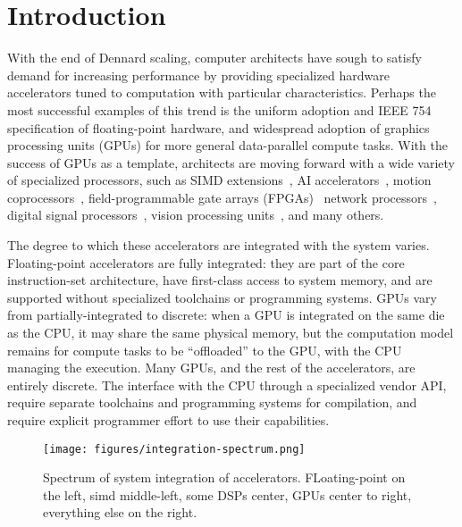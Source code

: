 
\chapter{Introduction}


With the end of Dennard scaling, computer architects have sough to satisfy demand for increasing performance by providing specialized hardware accelerators tuned to computation with particular characteristics.
Perhaps the most successful examples of this trend is the uniform adoption and IEEE 754 specification of floating-point hardware, and widespread adoption of graphics processing units (GPUs) for more general data-parallel compute tasks.
With the success of GPUs as a template, architects are moving forward with a wide variety of specialized processors, such as
SIMD extensions~,
AI accelerators~,
motion coprocessors~,
field-programmable gate arrays (FPGAs)~
network processors~,
digital signal processors~,
vision processing units~,
and many others.

The degree to which these accelerators are integrated with the system varies.
Floating-point accelerators are fully integrated: they are part of the core instruction-set architecture, have first-class access to system memory, and are supported without specialized toolchains or programming systems.
GPUs vary from partially-integrated to discrete: when a GPU is integrated on the same die as the CPU, it may share the same physical memory, but the computation model remains for compute tasks to be ``offloaded'' to the GPU, with the CPU managing the execution.
Many GPUs, and the rest of the accelerators, are entirely discrete.
The interface with the CPU through a specialized vendor API, require separate toolchains and programming systems for compilation, and require explicit programmer effort to use their capabilities.

\begin{figure}[ht]
    \centering
    \texttt{[image: figures/integration-spectrum.png]}
    \caption{Spectrum of system integration of accelerators. FLoating-point on the left, simd middle-left, some DSPs center, GPUs center to right, everything else on the right.}
    \label{fig:integration-spectrum}
\end{figure}

